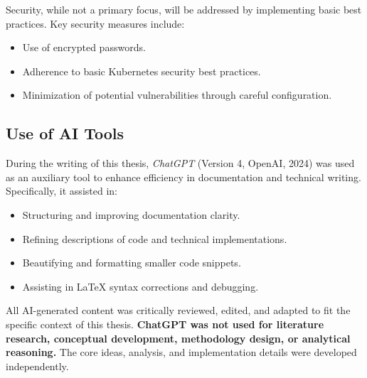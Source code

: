 Security, while not a primary focus, will be addressed by implementing basic best practices. Key security measures include:
\begin{itemize}
\item Use of encrypted passwords.
\item Adherence to basic Kubernetes security best practices.
\item Minimization of potential vulnerabilities through careful configuration.
\end{itemize}

\subsection{Use of AI Tools}
During the writing of this thesis, \textit{ChatGPT}\parencite{OpenAI_ChatGPT_2024} (Version 4, OpenAI, 2024) was used as an auxiliary tool to enhance efficiency in documentation and technical writing. Specifically, it assisted in:
\begin{itemize}
\item Structuring and improving documentation clarity.
\item Refining descriptions of code and technical implementations.
\item Beautifying and formatting smaller code snippets.
\item Assisting in LaTeX syntax corrections and debugging.
\end{itemize}
All AI-generated content was critically reviewed, edited, and adapted to fit the specific context of this thesis. \textbf{ChatGPT was not used for literature research, conceptual development, methodology design, or analytical reasoning.} The core ideas, analysis, and implementation details were developed independently.